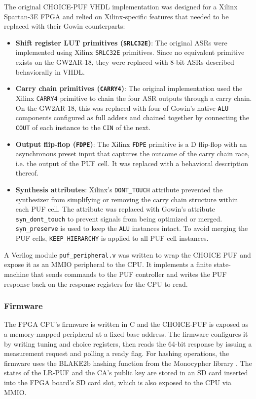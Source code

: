 The original CHOICE-PUF VHDL implementation was designed for a Xilinx Spartan-3E FPGA and relied on Xilinx-specific features that needed to be replaced with their Gowin counterparts:
\begin{itemize}
    \item \textbf{Shift register LUT primitives (\texttt{SRLC32E})}: The original ASRs were implemented using Xilinx \texttt{SRLC32E} primitives. Since no equivalent primitive exists on the GW2AR-18, they were replaced with 8-bit ASRs described behaviorally in VHDL.
    \item \textbf{Carry chain primitives (\texttt{CARRY4})}: The original implementation used the Xilinx \texttt{CARRY4} primitive to chain the four ASR outputs through a carry chain. On the GW2AR-18, this was replaced with four of Gowin's native \texttt{ALU} components configured as full adders and chained together by connecting the \verb|COUT| of each instance to the \verb|CIN| of the next.
    \item \textbf{Output flip-flop (\texttt{FDPE})}: The Xilinx \texttt{FDPE} primitive is a D flip-flop with an asynchronous preset input that captures the outcome of the carry chain race, i.e. the output of the PUF cell. It was replaced with a behavioral description thereof. 
    \item \textbf{Synthesis attributes}: Xilinx's \texttt{DONT\_TOUCH} attribute prevented the synthesizer from simplifying or removing the carry chain structure within each PUF cell. The attribute was replaced with Gowin's attribute \texttt{syn\_dont\_touch} to prevent signals from being optimized or merged. \texttt{syn\_preserve} is used to keep the \texttt{ALU} instances intact. To avoid merging the PUF cells, \texttt{KEEP\_HIERARCHY} is applied to all PUF cell instances.
\end{itemize}

A Verilog module \texttt{puf\_peripheral.v} was written to wrap the CHOICE PUF and expose it as an MMIO peripheral to the CPU. It implements a finite state-machine that sends commands to the PUF controller and writes the PUF response back on the response registers for the CPU to read.




\subsubsection{Firmware}
The FPGA CPU's firmware is written in C and the CHOICE-PUF is exposed as a memory-mapped peripheral at a fixed base address. The firmware configures it by writing tuning and choice registers, then reads the 64-bit response by issuing a measurement request and polling a ready flag. For hashing operations, the firmware uses the BLAKE2b \cite{rfc7693} hashing function from the Monocypher library \cite{monocypher}. The states of the LR-PUF and the CA's public key are stored in an SD card inserted into the FPGA board's SD card slot, which is also exposed to the CPU via MMIO. 

